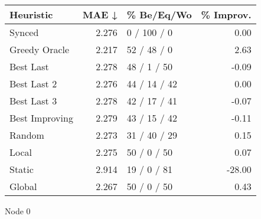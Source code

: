 \begin{tabular}{lrlr}
\toprule
\textbf{Heuristic} & \textbf{MAE ↓} & \textbf{\% Be/Eq/Wo} & \textbf{\% Improv.} \\
\midrule
            Synced &          2.276 &          0 / 100 / 0 &                0.00 \\
     Greedy Oracle &          2.217 &          52 / 48 / 0 &                2.63 \\
         Best Last &          2.278 &          48 / 1 / 50 &               -0.09 \\
       Best Last 2 &          2.276 &         44 / 14 / 42 &                0.00 \\
       Best Last 3 &          2.278 &         42 / 17 / 41 &               -0.07 \\
    Best Improving &          2.279 &         43 / 15 / 42 &               -0.11 \\
            Random &          2.273 &         31 / 40 / 29 &                0.15 \\
             Local &          2.275 &          50 / 0 / 50 &                0.07 \\
            Static &          2.914 &          19 / 0 / 81 &              -28.00 \\
            Global &          2.267 &          50 / 0 / 50 &                0.43 \\
\bottomrule
\end{tabular}
\caption{Node 0}
\label{tab:hr_iid_lr01_le2_bs2_0}
